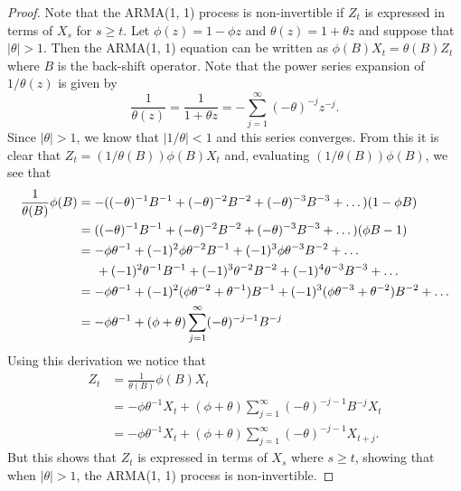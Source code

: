 \documentclass[12pt]{article}
\theoremstyle{definition}
\begin{document}
\begin{proof}
  Note that the ARMA(1, 1) process is non-invertible if $Z_t$ is expressed in
  terms of $X_s$ for $s\geq t$. Let $\phi(z) = 1 - \phi z$ and $\theta(z) = 1 + \theta z$
  and suppose that $|\theta| > 1$.
  Then the ARMA(1, 1) equation can be written as $\phi(B)X_t = \theta(B)Z_t$ where
  $B$ is the back-shift operator. Note that the power series expansion of $1/\theta(z)$
  is given by
  \[
    \frac{1}{\theta(z)} = \frac{1}{1+\theta z} = -\sum_{j=1}^{\infty} (-\theta)^{-j} z^{-j}.
  \]
  Since $|\theta| > 1$, we know that $|1/\theta| < 1$ and this series converges.
  From this it is clear that $Z_t = (1/\theta(B))\phi(B)X_t$ and,
  evaluating $(1/\theta(B))\phi(B)$, we see that
  \begin{align*}
    \frac{1}{\theta(B)}\phi(B)
    &= -((-\theta)^{-1} B^{-1} + (-\theta)^{-2} B^{-2} + (-\theta)^{-3} B^{-3} + \dots )(1 - \phi B)\\
    &= ((-\theta)^{-1} B^{-1} + (-\theta)^{-2} B^{-2} + (-\theta)^{-3} B^{-3} + \dots )(\phi B - 1)\\
    &= -\phi\theta^{-1} + (-1)^2\phi\theta^{-2}B^{-1} + (-1)^3\phi\theta^{-3}B^{-2} + \dots \\
    & \hspace{5mm} + (-1)^2\theta^{-1}B^{-1} + (-1)^{3}\theta^{-2}B^{-2} + (-1)^4\theta^{-3} B^{-3} + \dots\\
    &= -\phi\theta^{-1} + (-1)^2(\phi\theta^{-2} + \theta^{-1})B^{-1} + (-1)^3(\phi\theta^{-3} + \theta^{-2})B^{-2} + \dots\\
    &= -\phi\theta^{-1} + (\phi + \theta)\sum_{j=1}^{\infty} (-\theta)^{-j-1}B^{-j}
  \end{align*}
  Using this derivation we notice that
  \begin{align*}
    Z_t
    &= \frac{1}{\theta(B)}\phi(B) X_t \\
    &= -\phi\theta^{-1}X_t +(\phi + \theta)\sum_{j=1}^\infty (-\theta)^{-j-1}B^{-j}X_t \\
    &= -\phi\theta^{-1}X_t +(\phi + \theta)\sum_{j=1}^\infty (-\theta)^{-j-1}X_{t+j}.
  \end{align*}
  But this shows that $Z_t$ is expressed in terms of $X_s$ where $s\geq t$,
  showing that when $|\theta| > 1$, the ARMA(1, 1) process is non-invertible.
\end{proof}
\end{document}
